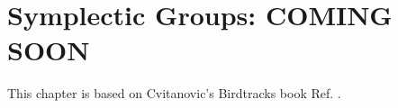 \chapter{Symplectic Groups: COMING SOON}
\label{ch-symp-groups}


This chapter is based on Cvitanovic's Birdtracks book Ref. \cite{birdtracks-book}.